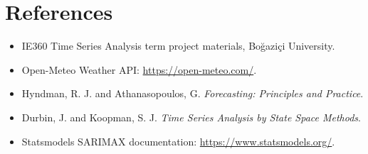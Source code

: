\documentclass[11pt]{article}
\begin{document}
\section*{References}

\begin{itemize}
    \item IE360 Time Series Analysis term project materials, Boğaziçi University.
    \item Open-Meteo Weather API: \url{https://open-meteo.com/}.
    \item Hyndman, R. J. and Athanasopoulos, G. \textit{Forecasting: Principles and Practice}.
    \item Durbin, J. and Koopman, S. J. \textit{Time Series Analysis by State Space Methods}.
    \item Statsmodels SARIMAX documentation: \url{https://www.statsmodels.org/}.
\end{itemize}
\end{document}
